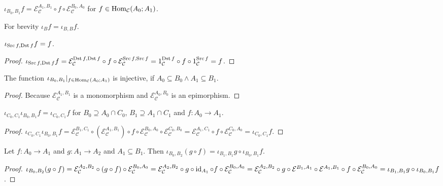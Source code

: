 \begin{defn}
  $\iota_{B_0, B_1} f = \mathcal{E}_{\mathcal{C}}^{A_1,B_1} \circ f \circ
  \mathcal{E}_{\mathcal{C}}^{B_0,A_0}$ for $f \in
  \operatorname{Hom}_{\mathcal{C}} (A_0 ; A_1)$.
\end{defn}

For brevity $\iota_B f = \iota_{B, B} f$.

\begin{prop}
  $\iota_{\operatorname{Src} f, \operatorname{Dst} f} f = f$.
\end{prop}

\begin{proof}
  $\iota_{\operatorname{Src} f, \operatorname{Dst} f} f = \mathcal{E}_\mathcal{C}^{\operatorname{Dst} f,\operatorname{Dst} f} \circ f \circ \mathcal{E}_\mathcal{C}^{\operatorname{Src} f,\operatorname{Src} f} =
  1_{\mathcal{C}}^{\operatorname{Dst} f} \circ f \circ 1_{\mathcal{C}}^{\operatorname{Src} f} = f$.
\end{proof}

\begin{prop}
  The function $\iota_{B_0, B_1} |_{f \in \operatorname{Hom}_{\mathcal{C}} (A_0 ;
  A_1)}$ is injective, if $A_0 \subseteq B_0 \wedge A_1 \subseteq B_1$.
\end{prop}

\begin{proof}
  Because $\mathcal{E}_{\mathcal{C}}^{A_1,B_1}$ is a monomorphism and $\mathcal{E}_{\mathcal{C}}^{A_0,B_0}$ is an epimorphism.
\end{proof}

\begin{prop}
  $\iota_{C_0, C_1} \iota_{B_0, B_1} f = \iota_{C_0, C_1} f$ for $B_0
  \supseteq A_0 \cap C_0$, $B_1 \supseteq A_1 \cap C_1$ and $f : A_0
  \rightarrow A_1$.
\end{prop}

\begin{proof}
  $\iota_{C_0, C_1} \iota_{B_0, B_1} f = \mathcal{E}_{\mathcal{C}}^{B_1,C_1}
  \circ (\mathcal{E}_{\mathcal{C}}^{A_1,B_1}) \circ f \circ \mathcal{E}_{\mathcal{C}}^{B_0,A_0} \circ
  \mathcal{E}_{\mathcal{C}}^{C_0,B_0} = \mathcal{E}_{\mathcal{C}}^{A_1,C_1} \circ f \circ \mathcal{E}_{\mathcal{C}}^{C_0,A_0} =
  \iota_{C_0,C_1} f$.
\end{proof}

\begin{prop}
  Let $f : A_0 \rightarrow A_1$ and $g : A_1 \rightarrow A_2$ and $A_1
  \subseteq B_1$. Then $\iota_{B_0, B_2} (g \circ f) = \iota_{B_1, B_1} g
  \circ \iota_{B_0, B_1} f$.
\end{prop}

\begin{proof}
  $\iota_{B_0, B_2} (g \circ f) = \mathcal{E}_{\mathcal{C}}^{A_2,B_2}
  \circ (g \circ f) \circ \mathcal{E}_{\mathcal{C}}^{B_0,A_0} = \mathcal{E}_{\mathcal{C}}^{A_2,B_2} \circ g \circ \operatorname{id}_{A_1} \circ f
  \circ \mathcal{E}_{\mathcal{C}}^{B_0,A_0} = \mathcal{E}_{\mathcal{C}}^{A_2,B_2} \circ g \circ \mathcal{E}^{B_1,A_1}
  \circ \mathcal{E}^{A_1,B_1} \circ f \circ \mathcal{E}_{\mathcal{C}}^{B_0,A_0} = \iota_{B_1, B_1} g \circ \iota_{B_0,
  B_1} f$.
\end{proof}

